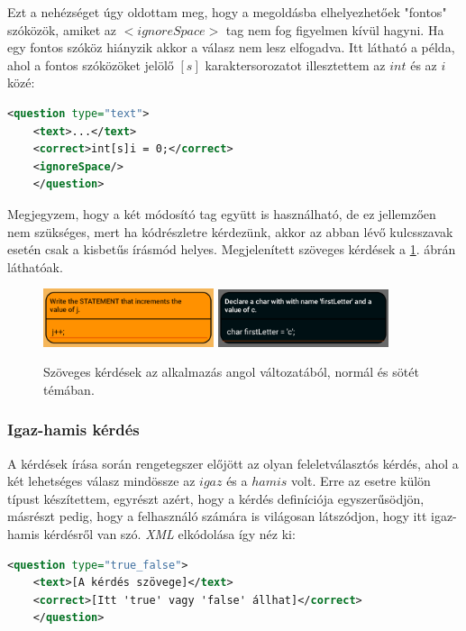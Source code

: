 \documentclass[12pt,a4paper]{article}
\newcommand{\xml}{\textit{XML}\xspace}
\begin{document}
	Ezt a nehézséget úgy oldottam meg, hogy a megoldásba elhelyezhetőek "fontos" szóközök, amiket az $<ignoreSpace>$ tag nem fog figyelmen kívül hagyni. Ha egy fontos szóköz hiányzik akkor a válasz nem lesz elfogadva. Itt látható a példa, ahol a fontos szóközöket jelölő $[s]$ karaktersorozatot illesztettem az $int$ és az $i$ közé:
	
	\begin{lstlisting}[language=XML]	
	<question type="text">
	<text>...</text>
	<correct>int[s]i = 0;</correct>
	<ignoreSpace/>
	</question>
	\end{lstlisting}
	
	\noindent
	Megjegyzem, hogy a két módosító tag együtt is használható, de ez jellemzően nem szükséges, mert ha kódrészletre kérdezünk, akkor az abban lévő kulcsszavak esetén csak a kisbetűs írásmód helyes. Megjelenített szöveges kérdések a \ref{question_text_figure}. ábrán láthatóak.
	
	\begin{figure}[h!]
		\centering
		\includegraphics[width=5cm]{question_text}
		\includegraphics[width=5cm]{question_text_dark}
		\caption{Szöveges kérdések az alkalmazás angol változatából, normál és sötét témában.}
		\label{question_text_figure}
	\end{figure}
	
	\subsubsection{Igaz-hamis kérdés}
	
	A kérdések írása során rengetegszer előjött az olyan feleletválasztós kérdés, ahol a két lehetséges válasz mindössze az $igaz$ és a $hamis$ volt. Erre az esetre külön típust készítettem, egyrészt azért, hogy a kérdés definíciója egyszerűsödjön, másrészt pedig, hogy a felhasználó számára is világosan látszódjon, hogy itt igaz-hamis kérdésről van szó. \xml elkódolása így néz ki:
	
	\begin{lstlisting}[language=XML]	
	<question type="true_false">
	<text>[A kérdés szövege]</text>
	<correct>[Itt 'true' vagy 'false' állhat]</correct>
	</question>
	\end{lstlisting}
	
\end{document}
